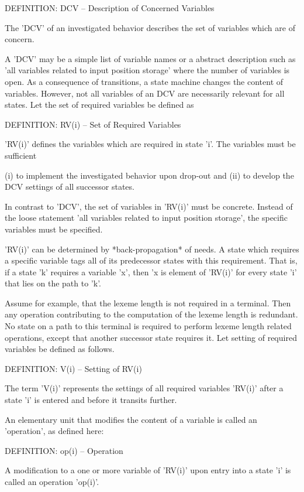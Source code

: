 \documentclass[12pt]{article}
\begin{document}
DEFINITION: DCV -- Description of Concerned Variables

    The 'DCV' of an investigated behavior describes the set of variables which
    are of concern. 

A 'DCV' may be a simple list of variable names or a abstract description such
as 'all variables related to input position storage' where the number of
variables is open.  As a consequence of transitions, a state machine changes
the content of variables. However, not all variables of an DCV are necessarily
relevant for all states. Let the set of required variables be defined as

DEFINITION: RV(i) -- Set of Required Variables

    'RV(i)' defines the variables which are required in state 'i'. The
    variables must be sufficient

      (i)  to implement the investigated behavior upon drop-out and
      (ii) to develop the DCV settings of all successor states.

In contrast to 'DCV', the set of variables in 'RV(i)' must be concrete.
Instead of the loose statement 'all variables related to input position
storage', the specific variables must be specified. 

'RV(i)' can be determined by *back-propagation* of needs. A state which
requires a specific variable tags all of its predecessor states with this
requirement. That is, if a state 'k' requires a variable 'x', then 'x is
element of 'RV(i)' for every state 'i' that lies on the path to 'k'.

Assume for example, that the lexeme length is not required in a terminal. Then
any operation contributing to the computation of the lexeme length is
redundant.  No state on a path to this terminal is required to perform lexeme
length related operations, except that another successor state requires it.
Let setting of required variables be defined as follows.

DEFINITION: V(i) -- Setting of RV(i)

    The term 'V(i)' represents the settings of all required variables 'RV(i)'
    after a state 'i' is entered and before it transits further. 
    
An elementary unit that modifies the content of a variable is called an
'operation', as defined here:

DEFINITION: op(i) -- Operation 

    A modification to a one or more variable of 'RV(i)' upon entry into a state
    'i' is called an operation 'op(i)'. 
    
\end{document}
